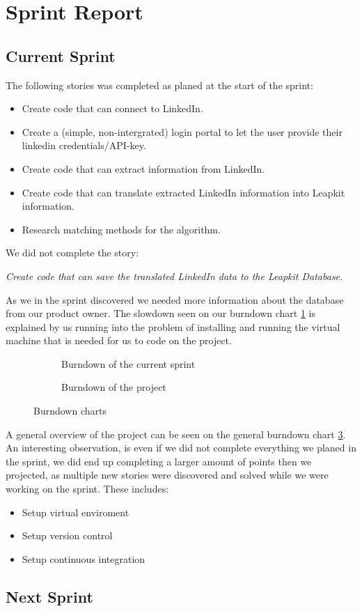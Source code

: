 \newpage
\section{Sprint Report}

\subsection{Current Sprint}

The following stories was completed as planed at the start of the sprint:
\begin{itemize}
    \item Create code that can connect to LinkedIn.
    \item Create a (simple, non-intergrated) login portal to let the user provide their linkedin credentials/API-key. 
    \item Create code that can extract information from LinkedIn.
    \item Create code that can translate extracted LinkedIn information into Leapkit information.
    \item Research matching methods for the algorithm.
\end{itemize}
We did not complete the story:
\begin{center}
    \emph{Create code that can save the translated LinkedIn data to the Leapkit Database.}
\end{center}
As we in the sprint discovered we needed more information about the database from our product owner.
The slowdown seen on our burndown chart \ref{fig:burndownSprint} is explained by us running into the problem
of installing and running the virtual machine that is needed for us to code on the project.\\
\begin{figure}[!ht]
    \centering
    \begin{subfigure}[b]{0.5\textwidth}
        \scalebox{.6}{}
        \caption{Burndown of the current sprint}
        \label{fig:burndownSprint}
    \end{subfigure}%
    \begin{subfigure}[b]{0.5\textwidth}
        \scalebox{.7}{}
        \caption{Burndown of the project}
        \label{fig:burndownProject}
    \end{subfigure}
    \caption{Burndown charts}
\end{figure}
A general overview of the project can be seen on the general burndown chart \ref{fig:burndownProject}.\\
An interesting observation, is even if we did not complete everything we planed in the sprint, we did
end up completing a larger amount of points then we projected, as multiple new stories were discovered and solved
while we were working on the sprint. These includes:
\begin{itemize}
    \item Setup virtual enviroment 
    \item Setup version control
    \item Setup continuous integration
\end{itemize}

\subsection{Next Sprint}

